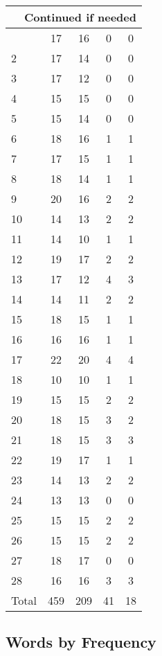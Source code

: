 \begin{center}
\begin{longtable}{l|c|c|c|c}
\hline \multicolumn{5}{|r|}{{Continued if needed}} \\ \hline
\endfoot 
1 & 17 & 16 & 0 & 0\\ \hline
2 & 17 & 14 & 0 & 0\\ \hline
3 & 17 & 12 & 0 & 0\\ \hline
4 & 15 & 15 & 0 & 0\\ \hline
5 & 15 & 14 & 0 & 0\\ \hline
6 & 18 & 16 & 1 & 1\\ \hline
7 & 17 & 15 & 1 & 1\\ \hline
8 & 18 & 14 & 1 & 1\\ \hline
9 & 20 & 16 & 2 & 2\\ \hline
10 & 14 & 13 & 2 & 2\\ \hline
11 & 14 & 10 & 1 & 1\\ \hline
12 & 19 & 17 & 2 & 2\\ \hline
13 & 17 & 12 & 4 & 3\\ \hline
14 & 14 & 11 & 2 & 2\\ \hline
15 & 18 & 15 & 1 & 1\\ \hline
16 & 16 & 16 & 1 & 1\\ \hline
17 & 22 & 20 & 4 & 4\\ \hline
18 & 10 & 10 & 1 & 1\\ \hline
19 & 15 & 15 & 2 & 2\\ \hline
20 & 18 & 15 & 3 & 2\\ \hline
21 & 18 & 15 & 3 & 3\\ \hline
22 & 19 & 17 & 1 & 1\\ \hline
23 & 14 & 13 & 2 & 2\\ \hline
24 & 13 & 13 & 0 & 0\\ \hline
25 & 15 & 15 & 2 & 2\\ \hline
26 & 15 & 15 & 2 & 2\\ \hline
27 & 18 & 17 & 0 & 0\\ \hline
28 & 16 & 16 & 3 & 3\\ \hline
\hline \hline
Total & 459 & 209 & 41 & 18




\end{longtable}
\end{center}



\subsection{Words by Frequency}

